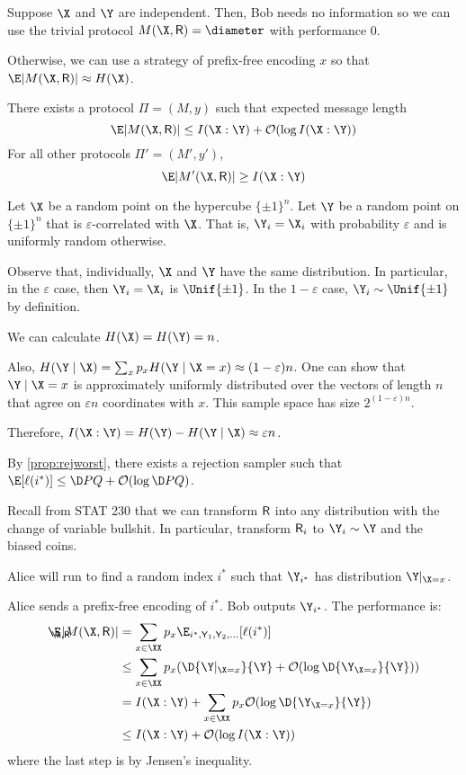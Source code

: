 \documentclass[class=co432,notes,tikz]{agony}
\begin{document}
Suppose $\X$ and $\Y$ are independent.
Then, Bob needs no information so we can use the trivial protocol
$M(\X,\rv R) = \varnothing$ with performance 0.

Otherwise, we can use a strategy of prefix-free encoding $x$
so that $\E\abs{M(\X,\rv R)} \approx H(\X)$.

\begin{theorem}
  There exists a protocol $\Pi = (M,y)$ such that expected message length
  \[ \E\abs{M(\X,\rv R)} \leq I(\X : \Y) + \order{\log I(\X : \Y)} \]
  For all other protocols $\Pi' = (M',y')$,
  \[ \E\abs{M'(\X,\rv R)} \geq I(\X : \Y) \]
\end{theorem}
\begin{prf}
  Let $\X$ be a random point on the hypercube $\{\pm1\}^n$.
  Let $\Y$ be a random point on $\{\pm1\}^n$ that is $\varepsilon$-correlated with $\X$.
  That is, $\Y_i = \X_i$ with probability $\varepsilon$
  and is uniformly random otherwise.

  Observe that, individually, $\X$ and $\Y$ have the same distribution.
  In particular, in the $\varepsilon$ case, then $\Y_i = \X_i$ is $\Unif\{\pm1\}$.
  In the $1-\varepsilon$ case, $\Y_i \sim \Unif\{\pm1\}$ by definition.

  We can calculate $H(\X) = H(\Y) = n$.

  Also, $H(\Y\mid\X) = \sum_{x} p_x H(\Y\mid\X=x) \approx (1-\varepsilon)n$.
  One can show that $\Y\mid\X=x$ is approximately uniformly distributed
  over the vectors of length $n$ that agree on $\varepsilon n$ coordinates with $x$.
  This sample space has size $2^{(1-\varepsilon)n}$.

  Therefore, $I(\X:\Y) = H(\Y) - H(\Y \mid \X) \approx \varepsilon n$.

  By \cref{prop:rejworst}, there exists a rejection sampler such that
  $\E[\ell(i^*)] \leq \D P Q + \order{\log \D P Q}$.

  Recall from STAT 230 that we can transform $\mathsf R$ into any distribution
  with the change of variable bullshit.
  In particular, transform $\mathsf R_i$ to \iid $\Y_i \sim \Y$ and the biased coins.

  Alice will run  to find a random index $i^*$
  such that $\Y_{i^*}$ has distribution $\Y|_{\X=x}$.

  Alice sends a prefix-free encoding of $i^*$. Bob outputs $\Y_{i^*}$.
  The performance is:
  \begin{align*}
    \E_{\mathclap{\X,\rv R}} \abs{M(\X,\rv R)}
     & = \sum_{x\in\XX} p_x \E_{i^*,\rv Y_1,\rv Y_2,\dotsc}[\ell(i^*)]   \\
     & \leq \sum_{x\in\XX} p_x \qty(\D{\Y|_{\X=x}}{\Y} + \order{\log \D{\Y_{\X=x}}{\Y}}) \\
     & = I(\X:\Y) + \sum_{x\in\XX}p_x\order{\log \D{\Y_{\X=x}}{\Y}}                      \\
     & \leq I(\X:\Y) + \order{\log I(\X:\Y)}
  \end{align*}
  where the last step is by Jensen's inequality.


\end{prf}
\end{document}
